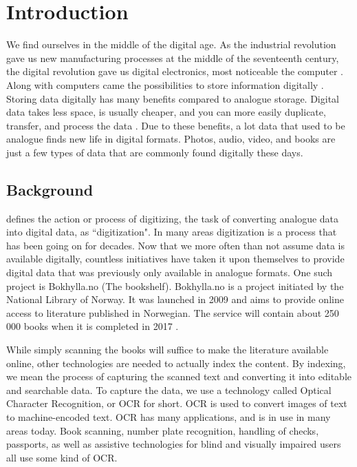 
\chapter{Introduction}
\label{ch:introduction}
We find ourselves in the middle of the digital age. As the industrial revolution gave us new manufacturing processes at the middle of the seventeenth century, the digital revolution gave us digital electronics, most noticeable the computer \citep{freeman2001time}. Along with computers came the possibilities to store information digitally . Storing data digitally has many benefits compared to analogue storage. Digital data takes less space, is usually cheaper, and you can more easily duplicate, transfer, and process the data . Due to these benefits, a lot data that used to be analogue finds new life in digital formats. Photos, audio, video, and books are just a few types of data that are commonly found digitally these days.


\section{Background}
\citep{misc-oed-digitization} defines the action or process of digitizing, the task of converting analogue data into digital data, as ``digitization". In many areas digitization is a process that has been going on for decades. Now that we more often than not assume data is available digitally, countless initiatives have taken it upon themselves to provide digital data that was previously only available in analogue formats. One such project is Bokhylla.no (The bookshelf). Bokhylla.no is a project initiated by the National Library of Norway. It was launched in 2009 and aims to provide online access to literature published in Norwegian. The service will contain about 250 000 books when it is completed in 2017 \citep{misc-nb-digial-library}.

While simply scanning the books will suffice to make the literature available online, other technologies are needed to actually index the content. By indexing, we mean the process of capturing the scanned text and converting it into editable and searchable data. To capture the data, we use a technology called Optical Character Recognition, or OCR for short. OCR is used to convert images of text to machine-encoded text. OCR has many applications, and is in use in many areas today. Book scanning, number plate recognition, handling of checks, passports, as well as assistive technologies for blind and visually impaired users all use some kind of OCR.

